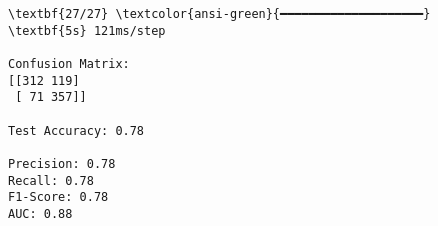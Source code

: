 \documentclass[11pt]{article}
\begin{document}
    \begin{Verbatim}[commandchars=\\\{\}]
\textbf{27/27} \textcolor{ansi-green}{━━━━━━━━━━━━━━━━━━━━} \textbf{5s} 121ms/step

Confusion Matrix:
[[312 119]
 [ 71 357]]

Test Accuracy: 0.78

Precision: 0.78
Recall: 0.78
F1-Score: 0.78
AUC: 0.88
    \end{Verbatim}

    \begin{center}
    \end{center}
    { \hspace*{\fill} \\}
    
\end{document}
